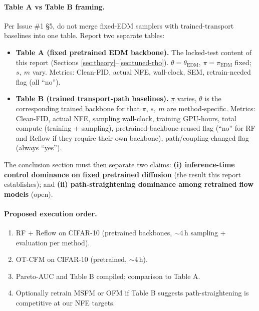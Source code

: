 \documentclass[11pt]{article}
\begin{document}
\paragraph{Table A vs Table B framing.} Per Issue \#1 \S5, do not merge
fixed-EDM samplers with trained-transport baselines into one table.
Report two separate tables:

\begin{itemize}
\item \textbf{Table A (fixed pretrained EDM backbone).} The locked-test
content of this report (Sections \ref{sec:theory}--\ref{sec:tuned-rho}).
\(\theta = \theta_{\mathrm{EDM}}\), \(\pi = \pi_{\mathrm{EDM}}\)
fixed; \(s,\ m\) vary. Metrics: Clean-FID, actual NFE, wall-clock,
SEM, retrain-needed flag (all ``no'').
\item \textbf{Table B (trained transport-path baselines).}
\(\pi\) varies, \(\theta\) is the corresponding trained backbone for
that \(\pi\), \(s,\ m\) are method-specific. Metrics: Clean-FID,
actual NFE, sampling wall-clock, training GPU-hours, total compute
(training + sampling), pretrained-backbone-reused flag (``no'' for RF
and Reflow if they require their own backbone),
path/coupling-changed flag (always ``yes'').
\end{itemize}

The conclusion section must then separate two claims:
\textbf{(i) inference-time control dominance on fixed pretrained
diffusion} (the result this report establishes); and
\textbf{(ii) path-straightening dominance among retrained flow models}
(open).

\paragraph{Proposed execution order.}
\begin{enumerate}
\item RF + Reflow on CIFAR-10 (pretrained backbones, \(\sim\)4\,h
sampling + evaluation per method).
\item OT-CFM on CIFAR-10 (pretrained, \(\sim\)4\,h).
\item Pareto-AUC and Table B compiled; comparison to Table A.
\item Optionally retrain MSFM or OFM if Table B suggests path-straightening
is competitive at our NFE targets.
\end{enumerate}
\end{document}
